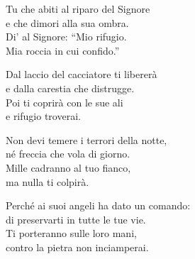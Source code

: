 
\strofa Tu che abiti al riparo del Signore\\
e che dimori alla sua ombra.\\
Di' al Signore: ``Mio rifugio.\\
Mia roccia in cui confido.''

\spazio


\spazio

\strofa Dal laccio del cacciatore ti libererà\\
e dalla carestia che distrugge.\\
Poi ti coprirà con le sue ali\\
e rifugio troverai.

\spazio


\spazio

\strofa Non devi temere i terrori della notte,\\
né freccia che vola di giorno.\\
Mille cadranno al tuo fianco,\\
ma nulla ti colpirà.

\spazio


\spazio

\strofa Perché ai suoi angeli ha dato un comando:\\
di preservarti in tutte le tue vie.\\
Ti porteranno sulle loro mani,\\
contro la pietra non inciamperai.

\spazio

